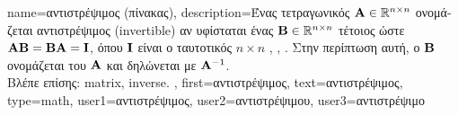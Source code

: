 {name={\foreignlanguage{greek}{αντιστρέψιμος (πίνακας)}}, 
	description={\foreignlanguage{greek}{Ένας τετραγωνικός}  ${\bf A} \in \mathbb{R}^{n \times n}$ 
		\foreignlanguage{greek}{ονομάζεται αντιστρέψιμος} (invertible) 
		\foreignlanguage{greek}{αν υφίσταται ένας}  ${\bf B} \in \mathbb{R}^{n \times n}$ 
		\foreignlanguage{greek}{τέτοιος ώστε ${\bf A} {\bf B} = {\bf B} {\bf A} = \mathbf{I}$, όπου $\mathbf{I}$ είναι ο ταυτοτικός}
		 $n \times n$ \cite{Strang2007}, \cite{Axler2025}, \cite{StrangLinAlg2016}. 
		\foreignlanguage{greek}{Στην περίπτωση αυτή, ο ${\bf B}$ ονομάζεται}  \foreignlanguage{greek}{του 
		${\bf A}$ και δηλώνεται με} ${\bf A}^{-1}$.
		\\
		\foreignlanguage{greek}{Βλέπε επίσης:} \gls{matrix}, \gls{inverse}. },
	first={\foreignlanguage{greek}{αντιστρέψιμος}},
	text={\foreignlanguage{greek}{αντιστρέψιμος}},
	type=math,
	user1={\foreignlanguage{greek}{αντιστρέψιμος}}, %
	user2={\foreignlanguage{greek}{αντιστρέψιμου}}, %
	user3={\foreignlanguage{greek}{αντιστρέψιμο}} %
}

